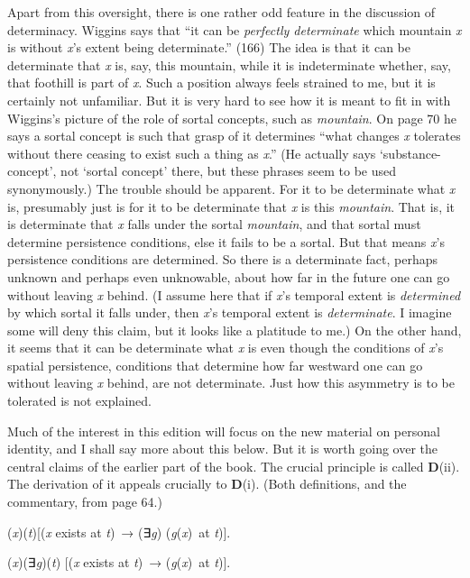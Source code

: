 \documentclass[
  10pt,
  letterpaper,
  DIV=11,
  numbers=noendperiod,
  twoside]{scrartcl}
\providecommand{\tightlist}{%
  \setlength{\itemsep}{0pt}\setlength{\parskip}{0pt}}\usepackage{longtable,booktabs,array}
\begin{document}
Apart from this oversight, there is one rather odd feature in the
discussion of determinacy. Wiggins says that ``it can be \emph{perfectly
determinate} which mountain \emph{x} is without \emph{x}'s extent being
determinate.'' (166) The idea is that it can be determinate that
\emph{x} is, say, this mountain, while it is indeterminate whether, say,
that foothill is part of \emph{x}. Such a position always feels strained
to me, but it is certainly not unfamiliar. But it is very hard to see
how it is meant to fit in with Wiggins's picture of the role of sortal
concepts, such as \emph{mountain}. On page 70 he says a sortal concept
is such that grasp of it determines ``what changes \emph{x} tolerates
without there ceasing to exist such a thing as \emph{x}.'' (He actually
says `substance-concept', not `sortal concept' there, but these phrases
seem to be used synonymously.) The trouble should be apparent. For it to
be determinate what \emph{x} is, presumably just is for it to be
determinate that \emph{x} is this \emph{mountain}. That is, it is
determinate that \emph{x} falls under the sortal \emph{mountain}, and
that sortal must determine persistence conditions, else it fails to be a
sortal. But that means \emph{x}'s persistence conditions are determined.
So there is a determinate fact, perhaps unknown and perhaps even
unknowable, about how far in the future one can go without leaving
\emph{x} behind. (I assume here that if \emph{x}'s temporal extent is
\emph{determined} by which sortal it falls under, then \emph{x}'s
temporal extent is \emph{determinate}. I imagine some will deny this
claim, but it looks like a platitude to me.) On the other hand, it seems
that it can be determinate what \emph{x} is even though the conditions
of \emph{x}'s spatial persistence, conditions that determine how far
westward one can go without leaving \emph{x} behind, are not
determinate. Just how this asymmetry is to be tolerated is not
explained.

Much of the interest in this edition will focus on the new material on
personal identity, and I shall say more about this below. But it is
worth going over the central claims of the earlier part of the book. The
crucial principle is called \textbf{D}(ii). The derivation of it appeals
crucially to \textbf{D}(i). (Both definitions, and the commentary, from
page 64.)

\begin{description}
\tightlist
\item[D(i)]
(\emph{x})(\emph{t}){[}(\emph{x} exists at \emph{t})~→ (∃\emph{g})
(\emph{g}(\emph{x})~at \emph{t}){]}.
\item[D(ii)]
(\emph{x})(∃\emph{g})(\emph{t}) {[}(\emph{x} exists at \emph{t})~→
(\emph{g}(\emph{x})~at \emph{t}){]}.
\end{description}
\end{document}
